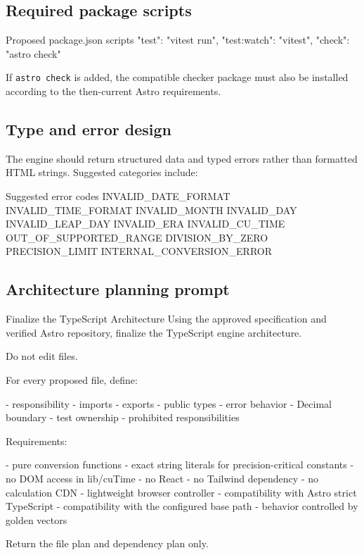 \documentclass[11pt,letterpaper]{article}
\begin{document}
\subsection{Required package scripts}

\begin{codebox}{Proposed package.json scripts}
"test": "vitest run",
"test:watch": "vitest",
"check": "astro check"
\end{codebox}

If \texttt{astro check} is added, the compatible checker package must also be
installed according to the then-current Astro requirements.

\subsection{Type and error design}

The engine should return structured data and typed errors rather than formatted
HTML strings. Suggested categories include:

\begin{codebox}{Suggested error codes}
INVALID_DATE_FORMAT
INVALID_TIME_FORMAT
INVALID_MONTH
INVALID_DAY
INVALID_LEAP_DAY
INVALID_ERA
INVALID_CU_TIME
OUT_OF_SUPPORTED_RANGE
DIVISION_BY_ZERO
PRECISION_LIMIT
INTERNAL_CONVERSION_ERROR
\end{codebox}

\subsection{Architecture planning prompt}

\begin{promptbox}{Finalize the TypeScript Architecture}
Using the approved specification and verified Astro repository,
finalize the TypeScript engine architecture.

Do not edit files.

For every proposed file, define:

- responsibility
- imports
- exports
- public types
- error behavior
- Decimal boundary
- test ownership
- prohibited responsibilities

Requirements:

- pure conversion functions
- exact string literals for precision-critical constants
- no DOM access in lib/cuTime
- no React
- no Tailwind dependency
- no calculation CDN
- lightweight browser controller
- compatibility with Astro strict TypeScript
- compatibility with the configured base path
- behavior controlled by golden vectors

Return the file plan and dependency plan only.
\end{promptbox}
\end{document}
